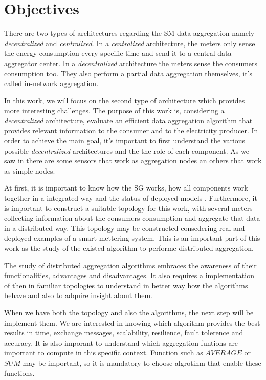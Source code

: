 \section{Objectives}
There are two types of architectures\cite{journals/spm/ErkinTLP13} regarding the SM data aggregation namely  \textit{decentralized} and \textit{centralized}. In a \textit{centralized} architecture, the meters only sense the energy consumption every specific time and send it to a central data aggregator center. In a \textit{decentralized} architecture the meters sense the consumers consumption too. They also perform a partial data aggregation themselves, it's called in-network aggregation\cite{journals/spm/ErkinTLP13}.

In this work, we will focus on the second type of architecture which provides more interesting challenges. The purpose of this work is, considering a \textit{decentralized} architecture, evaluate an efficient data aggregation algorithm that provides relevant information to the consumer and to the electricity producer. 
In order to achieve the main goal, it's important to first understand the various possible \textit{decentralized} architectures and the the role of each component. As  we saw in \cite{Girao2004c} there are some sensors that work as aggregation nodes an others that work as simple nodes. 

At first, it is important to know how the SG works, how all components work together in a integrated way and the status of deployed models . Furthermore, it is important to construct a suitable topology for this work, with several meters collecting information about the consumers consumption and aggregate that data in a distributed way. This topology may be constructed consedering real and deployed examples of a smart mettering system. This is an important part of this work as the study of the existed algorithm to performe distributed aggregation.

The study of distributed aggregation algorithms embraces the awareness of their functionalities, advantages and disadvantages. It also requires a implementation of then in familiar topologies to understand in better way how the algorithms behave and also to adquire insight about them. 

When we have both the topology and also the algorithms, the next step will be implement them. We are interested in knowing which algorithm provides the best results in time, exchange messages, scalability, resilience, fault tolerence and accuracy. It is also imporant to understand which aggregation funtions are important to compute in this specific context. Function such as $AVERAGE$ or $SUM$ may be important, so it is mandatory to choose algrotihm that enable these functions.

